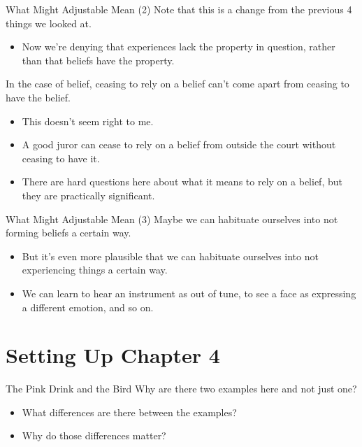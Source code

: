 \documentclass[
  17pt,
  letterpaper,
  ignorenonframetext,
  aspectratio=169,
  handout,
  xcolor={dvipsnames}]{beamer}
\providecommand{\tightlist}{%
  \setlength{\itemsep}{0pt}\setlength{\parskip}{0pt}}\usepackage{longtable,booktabs,array}
\begin{document}
\begin{frame}{What Might Adjustable Mean (2)}
\protect\hypertarget{what-might-adjustable-mean-2-1}{}
Note that this is a change from the previous 4 things we looked at.

\begin{itemize}[<+->]
\tightlist
\item
  Now we're denying that experiences lack the property in question,
  rather than that beliefs have the property.
\end{itemize}

\end{frame} \begin{frame}[plain]

In the case of belief, ceasing to rely on a belief can't come apart from
ceasing to have the belief.

\begin{itemize}[<+->]
\tightlist
\item
  This doesn't seem right to me.
\item
  A good juror can cease to rely on a belief from outside the court
  without ceasing to have it.
\item
  There are hard questions here about what it means to rely on a belief,
  but they are practically significant.
\end{itemize}
\end{frame}

\begin{frame}{What Might Adjustable Mean (3)}
\protect\hypertarget{what-might-adjustable-mean-3}{}
Maybe we can habituate ourselves into not forming beliefs a certain way.

\begin{itemize}[<+->]
\tightlist
\item
  But it's even more plausible that we can habituate ourselves into not
  experiencing things a certain way.
\item
  We can learn to hear an instrument as out of tune, to see a face as
  expressing a different emotion, and so on.
\end{itemize}
\end{frame}

\hypertarget{setting-up-chapter-4}{%
\section{Setting Up Chapter 4}\label{setting-up-chapter-4}}

\begin{frame}{The Pink Drink and the Bird}
\protect\hypertarget{the-pink-drink-and-the-bird}{}
Why are there two examples here and not just one?

\begin{itemize}[<+->]
\tightlist
\item
  What differences are there between the examples?
\item
  Why do those differences matter?
\end{itemize}
\end{frame}
\end{document}

